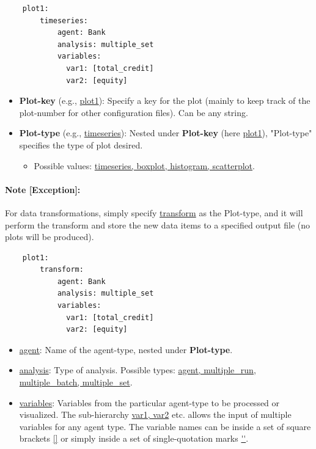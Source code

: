 \documentclass[10pt,a4paper]{article}
\begin{document}
\begin{lstlisting}
    plot1:
        timeseries:
            agent: Bank
            analysis: multiple_set
            variables: 
              var1: [total_credit]  
              var2: [equity]
\end{lstlisting}    
 
\begin{itemize}
    \item \textbf{Plot-key} (e.g., \url{plot1}): Specify a key for the plot (mainly to keep track of the plot-number for other configuration files). Can be any string.
    \item \textbf{Plot-type} (e.g., \url{timeseries}): Nested under \textbf{Plot-key} (here \url{plot1}), "Plot-type" specifies the type of plot desired.
	\begin{itemize}
		\item Possible values: \url{timeseries, boxplot, histogram, scatterplot}.
	\end{itemize}
\end{itemize}

\paragraph{Note [Exception]:} For data transformations, simply specify \url{transform} as the Plot-type, and it will perform the transform and store the new data items to a specified output file (no plots will be produced). 
\begin{lstlisting}
    plot1:
        transform:
            agent: Bank
            analysis: multiple_set
            variables: 
              var1: [total_credit]  
              var2: [equity]
\end{lstlisting}    

\begin{itemize}
    \item \url{agent}: Name of the agent-type, nested under \textbf{Plot-type}.

    \item \url{analysis}: Type of analysis. Possible types:  \url{agent, multiple_run, multiple_batch, multiple_set}.

    \item \url{variables}: Variables from the particular agent-type to be processed or visualized. The sub-hierarchy \url{var1, var2} etc. allows the input of multiple variables for any agent type.
    The variable names can be inside a set of square brackets \url{[]} or simply inside a set of single-quotation marks \url{''}.
\end{itemize}
\end{document}

